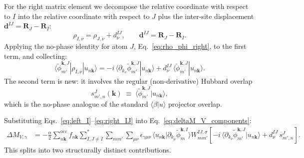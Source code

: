 \documentclass[11pt]{article}
\begin{document}
For the right matrix element we decompose the relative coordinate with
respect to $I$ into the relative coordinate with respect to $J$ plus
the inter-site displacement $\mathbf{d}^{IJ}=\mathbf{R}_J-\mathbf{R}_I$:
\begin{equation}
  \rho_{I,\nu} = \rho_{J,\nu} + d^{IJ}_\nu,
  \qquad
  \mathbf{d}^{IJ} = \mathbf{R}_J - \mathbf{R}_I.
  \label{eq:rho_decomp}
\end{equation}
Applying the no-phase identity for atom $J$,
Eq.~\eqref{eq:rho_phi_right}, to the first term, and collecting:
\begin{equation}
  \langle\widetilde\phi^{\mathbf{k},J}_{m'}|\rho_{I,\nu}|u_{n\mathbf{k}}\rangle
  =
  -i\,\langle\partial_{k_\nu}\widetilde\phi^{\mathbf{k},J}_{m'}|u_{n\mathbf{k}}\rangle
  +
  d^{IJ}_\nu\,
  \langle\widetilde\phi^{\mathbf{k},J}_{m'}|u_{n\mathbf{k}}\rangle.
  \label{eq:right_IJ}
\end{equation}
The second term is new: it involves the regular (non-derivative) Hubbard
overlap
\begin{equation}
  s^{J}_{m',n}(\mathbf{k})
  \;\equiv\;
  \langle\widetilde\phi^{\mathbf{k},J}_{m'}|u_{n\mathbf{k}}\rangle,
  \label{eq:hubbecp}
\end{equation}
which is the no-phase analogue of the standard $\langle\beta|u\rangle$
projector overlap.

Substituting Eqs.~\eqref{eq:left_I}--\eqref{eq:right_IJ} into
Eq.~\eqref{eq:deltaM_V_components}:
\begin{align}
  \Delta M_{V,\gamma}
  &=
  -\frac{\alpha}{2}
  \sum_{n\mathbf{k}}^{\mathrm{occ}}f_{n\mathbf{k}}
  \sum_{I,J\ne I}^{*}\sum_{mm'}\sum_{\mu\nu}
  \epsilon_{\gamma\mu\nu}\,
  \langle u_{n\mathbf{k}}|\partial_{k_\mu}\widetilde\phi^{\mathbf{k},I}_{m}\rangle
  W_{mm'}^{IJ,\sigma}
  \!\left[
    -i\,\langle\partial_{k_\nu}\widetilde\phi^{\mathbf{k},J}_{m'}|u_{n\mathbf{k}}\rangle
    +
    d^{IJ}_\nu\,s^{J}_{m',n}
  \right].
  \label{eq:deltaM_V_split}
\end{align}
This splits into two structurally distinct contributions.
\end{document}
